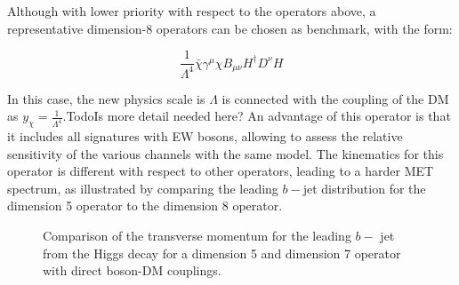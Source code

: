 Although with lower priority with respect to the operators above, 
a representative dimension-8 operators can be chosen as benchmark, with the form:
 
$$\frac{1}{\Lambda^4} \bar{\chi} \gamma^{\mu} \chi B_{\mu \nu} H^{\dagger} D^{\nu} H$$

In this case, the new physics scale is $\Lambda$ is connected with the coupling
of the DM as $y_{\chi} = \frac{1}{\Lambda^{4}}$.Todo{Is more detail needed here?}
An advantage of this operator is that it includes all signatures with EW bosons,
allowing to assess the relative sensitivity of the various channels with the same model.  
The kinematics for this operator is different with respect to other operators,
leading to a harder MET spectrum, 
as illustrated by comparing the leading $b-$jet distribution for the dimension 5 operator
to the dimension 8 operator. 
  
   \begin{figure}[hbpt!]
   	\centering
   	\hfill
   	\caption{Comparison of the transverse momentum for the leading $b-$ jet from the Higgs decay for a dimension 5 and dimension 7 operator
   		with direct boson-DM couplings.}
   	\end{figure}
  

